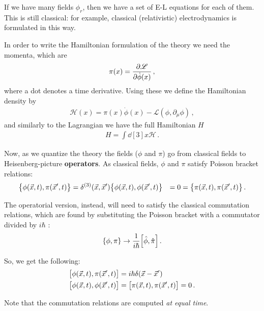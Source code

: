 \documentclass[main.tex]{subfiles}
\begin{document}
If we have many fields \(\phi_{r}\), then we have a set of E-L equations for each of them. 
This is still classical: for example, classical (relativistic) electrodynamics is formulated in this way.

In order to write the Hamiltonian formulation of the theory we need the momenta, which are 
%
\begin{align}
\pi (x) = \pdv{\mathscr{L}}{\dot{\phi} (x)}
\,,
\end{align}
%
where a dot denotes a time derivative.
Using these we define the Hamiltonian density by 
%
\begin{align}
\mathscr{H} (x) = \pi (x) \dot{\phi} (x) - \mathscr{L}(\phi, \partial_{\mu }\phi )
\,,
\end{align}
%
and similarly to the Lagrangian we have the full Hamiltonian \(H\)
%
\begin{align}
H = \int \dd[3]{x} \mathscr{H}
\,.
\end{align}

Now, as we quantize the theory the fields (\(\phi \) and \(\pi \)) go from classical fields to Heisenberg-picture \textbf{operators}. 
As classical fields, \(\phi \) and \(\pi \) satisfy Poisson bracket relations: 
%
\begin{align}
\qty{\phi (\vec{x}, t), \pi (\vec{x}', t)} &= \delta^{(3)} (\vec{x}, \vec{x}')
\qty{\phi (\vec{x}, t), \phi  (\vec{x}', t)} &= 0 = 
\qty{\pi (\vec{x}, t), \pi  (\vec{x}', t)}  
\,.
\end{align}

The operatorial version, instead, will need to satisfy the classical commutation relations, which are found by substituting the Poisson bracket with a commutator divided by \(i \hbar\) \cite[section 2.4.2]{tissinoTheoreticalPhysicsNotes2020}: 
%
\begin{align}
\qty{\phi , \pi } \to \frac{1}{i \hbar} \qty[\hat{\phi}, \hat{\pi}]
\,.
\end{align}

So, we get the following: 
%
\begin{subequations}
\begin{align}
\qty[\phi (\vec{x}, t), \pi (\vec{x}', t)] &= i \hbar \delta (\vec{x} - \vec{x}')  \\
\qty[\phi (\vec{x}, t), \phi  (\vec{x}', t)] &=
\qty[\pi (\vec{x}, t), \pi  (\vec{x}', t)] = 0
\,.
\end{align}
\end{subequations}

Note that the commutation relations are computed \emph{at equal time}. 
\end{document}
